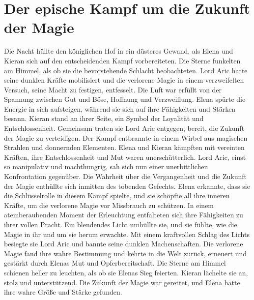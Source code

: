 \documentclass[12pt]{article} %
\begin{document}
\section{ Der epische Kampf um die Zukunft der Magie }
\begin{minipage}{\textwidth}
    Die Nacht hüllte den königlichen Hof in ein düsteres Gewand, als Elena und Kieran sich auf den entscheidenden Kampf vorbereiteten. Die Sterne funkelten am Himmel, als ob sie die bevorstehende Schlacht beobachteten. Lord Aric hatte seine dunklen Kräfte mobilisiert und die verlorene Magie in einem verzweifelten Versuch, seine Macht zu festigen, entfesselt. Die Luft war erfüllt von der Spannung zwischen Gut und Böse, Hoffnung und Verzweiflung. Elena spürte die Energie in sich aufsteigen, während sie sich auf ihre Fähigkeiten und Stärken besann. Kieran stand an ihrer Seite, ein Symbol der Loyalität und Entschlossenheit. Gemeinsam traten sie Lord Aric entgegen, bereit, die Zukunft der Magie zu verteidigen. Der Kampf entbrannte in einem Wirbel aus magischen Strahlen und donnernden Elementen. Elena und Kieran kämpften mit vereinten Kräften, ihre Entschlossenheit und Mut waren unerschütterlich. Lord Aric, einst so manipulativ und machthungrig, sah sich nun einer unerbittlichen Konfrontation gegenüber. Die Wahrheit über die Vergangenheit und die Zukunft der Magie enthüllte sich inmitten des tobenden Gefechts. Elena erkannte, dass sie die Schlüsselrolle in diesem Kampf spielte, und sie schöpfte all ihre inneren Kräfte, um die verlorene Magie vor Missbrauch zu schützen. In einem atemberaubenden Moment der Erleuchtung entfalteten sich ihre Fähigkeiten zu ihrer vollen Pracht. Ein blendendes Licht umhüllte sie, und sie fühlte, wie die Magie in ihr und um sie herum erwachte. Mit einem kraftvollen Schlag des Lichts besiegte sie Lord Aric und bannte seine dunklen Machenschaften. Die verlorene Magie fand ihre wahre Bestimmung und kehrte in die Welt zurück, erneuert und gestärkt durch Elenas Mut und Opferbereitschaft. Die Sterne am Himmel schienen heller zu leuchten, als ob sie Elenas Sieg feierten. Kieran lächelte sie an, stolz und unterstützend. Die Zukunft der Magie war gerettet, und Elena hatte ihre wahre Größe und Stärke gefunden.
\end{minipage}

\clearpage
\end{document}
